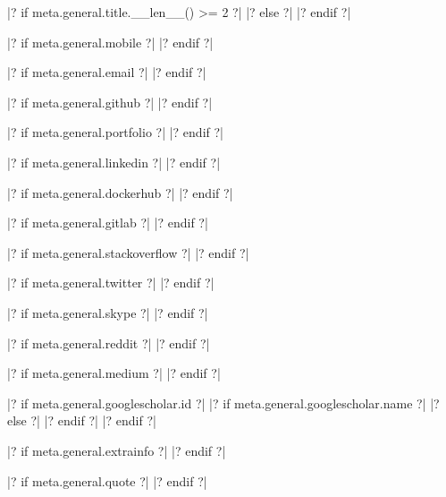 

|? if meta.general.title.__len__() >= 2 ?|
|? else ?|
|? endif ?|


\address{|= meta.general.location =|{\enskip\cdotp\enskip}|= meta.general.languages =|}

|? if meta.general.mobile ?|
|? endif ?|

|? if meta.general.email ?|
|? endif ?|

|? if meta.general.github ?|
|? endif ?|

|? if meta.general.portfolio ?|
|? endif ?|

|? if meta.general.linkedin ?|
|? endif ?|

|? if meta.general.dockerhub ?|
|? endif ?|

|? if meta.general.gitlab ?|
|? endif ?|

|? if meta.general.stackoverflow ?|
|? endif ?|

|? if meta.general.twitter ?|
|? endif ?|

|? if meta.general.skype ?|
|? endif ?|

|? if meta.general.reddit ?|
|? endif ?|

|? if meta.general.medium ?|
|? endif ?|

|? if meta.general.googlescholar.id ?|
|? if meta.general.googlescholar.name ?|
|? else ?|
|? endif ?|
|? endif ?|

|? if meta.general.extrainfo ?|
|? endif ?|

|? if meta.general.quote ?|
|? endif ?|

